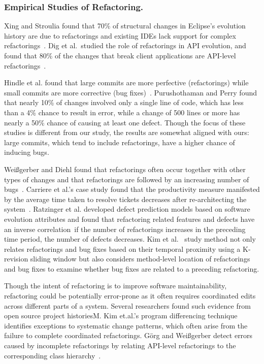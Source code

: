 \documentclass[runningheads,a4paper]{llncs}
\begin{document}
\subsubsection{Empirical Studies of Refactoring.} 

Xing and Stroulia found that 70\% of structural changes in Eclipse's evolution history are due to refactorings and existing IDEs lack support for complex refactorings~\cite{UMLDiff2005}. Dig et al.~studied the role of refactorings in API evolution, and found that 80\% of the changes that break client applications are API-level refactorings~\cite{Dig'05}. 

Hindle et al. found that large commits are more perfective (refactorings) while small commits are more corrective (bug fixes)~\cite{Hindle2008:largecommit}. Purushothaman and Perry found that nearly 10\% of changes involved only a single line of code, which has less than a 4\% chance to result in error, while a change of 500 lines or more has nearly a 50\% chance of causing at least one defect. Though the focus of these studies is different from our study, the results are somewhat aligned with ours: large commits, which tend to include refactorings, have a higher chance of inducing bugs. 

Wei{\ss}gerber and Diehl found that refactorings often occur together with other types of changes and that refactorings are followed by an increasing number of bugs~\cite{Weissgerber2006:refactor}. Carriere et al.'s case study found that the productivity measure manifested by the average time taken to resolve tickets decreases after re-architecting the system~\cite{Carriere2010:architecture}. 
Ratzinger et al. developed defect prediction models based on software evolution attributes and found that refactoring related features and defects have an inverse correlation~\cite{Ratzinger2008:refactor}\textemdash if the number of refactorings increases in the preceding time period, the number of defects decreases. Kim et al.~\cite{Kim2011:refactorbug} study method not only relates refactorings and bug fixes based on their temporal proximity using a K-revision sliding window but also considers method-level location of refactorings and bug fixes to examine whether bug fixes are related to a preceding refactoring. 

Though the intent of refactoring is to improve software maintainability, refactoring could be potentially error-prone as it often requires coordinated edits across different parts of a system. Several researchers found such evidence from open source project histories\textemdash M. Kim et.al.'s program differencing technique~\cite{Kim2007,Kim:2009} identifies exceptions to systematic change patterns, which often arise from the failure to complete coordinated refactorings. G{\"o}rg and Wei{\ss}gerber detect errors caused by incomplete refactorings by relating API-level refactorings to the corresponding class hierarchy~\cite{Weissgerber2006:refactor}. 
\end{document}
